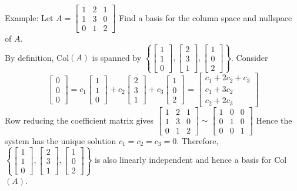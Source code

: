 \documentclass[10pt,letter]{article}
\begin{document}
Example: Let $A=\begin{bmatrix}1&2&1\\1&3&0\\0&1&2\end{bmatrix}$ Find a basis for the column space and nullspace of $A$. \\ 
By definition, Col$(A)$ is spanned by $\left\{\begin{bmatrix}1\\1\\0\end{bmatrix},\begin{bmatrix}2\\3\\1\end{bmatrix},\begin{bmatrix}1\\0\\2\end{bmatrix}\right\}$. Consider $$\begin{bmatrix}0\\0\\0\end{bmatrix}=c_1\begin{bmatrix}1\\1\\0\end{bmatrix}+c_2\begin{bmatrix}2\\3\\1\end{bmatrix}+c_3\begin{bmatrix}1\\0\\2\end{bmatrix}=\begin{bmatrix}c_1+2c_2+c_3\\c_1+3c_2\\c_2+2c_3\end{bmatrix}$$ Row reducing the coefficient matrix gives $\begin{bmatrix}1&2&1\\1&3&0\\0&1&2\end{bmatrix}\sim\begin{bmatrix}1&0&0\\0&1&0\\0&0&1\end{bmatrix}$ Hence the system has the unique solution $c_1=c_2=c_3=0$. Therefore, $\left\{\begin{bmatrix}1\\1\\0\end{bmatrix},\begin{bmatrix}2\\3\\1\end{bmatrix},\begin{bmatrix}1\\0\\2\end{bmatrix}\right\}$ is also linearly independent and hence a basis for Col$(A)$. \\ 
\end{document}
